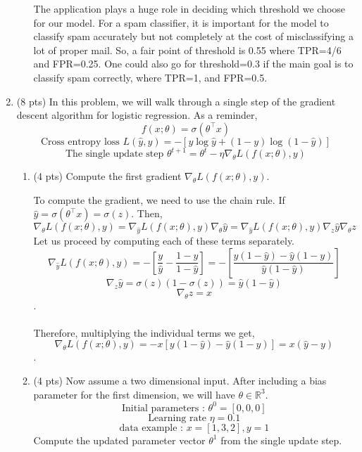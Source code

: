 \documentclass[a4paper]{article}
\theoremstyle{definition}
\newenvironment{soln}{
    \leavevmode\color{blue}\ignorespaces
}{}
\begin{document}
\begin{enumerate}
\begin{enumerate}
	\begin{soln}  The application plays a huge role in deciding which threshold we choose for our model. For a spam classifier, it is important for the model to classify spam accurately but not completely at the cost of misclassifying a lot of proper mail. So, a fair point of threshold is 0.55 where TPR=4/6 and FPR=0.25. One could also go for threshold=0.3 if the main goal is to classify spam correctly, where TPR=1, and FPR=0.5. \end{soln}
\end{enumerate}

\item (8 pts) In this problem, we will walk through a single step of the gradient descent algorithm for logistic regression. As a reminder,
$$f(x;\theta) = \sigma(\theta^\top x)$$
$$\text{Cross entropy loss } L(\hat{y}, y) = -[y \log  \hat{y} + (1-y)\log(1-\hat{y})]$$
$$\text{The single update step } \theta^{t+1} = \theta^{t} - \eta \nabla_{\theta} L(f(x;\theta), y) $$



\begin{enumerate}
	\item (4 pts) Compute the first gradient $\nabla_{\theta} L(f(x;\theta), y)$.
	
	\begin{soln}  To compute the gradient, we need to use the chain rule. If $\hat{y}=\sigma(\theta^\top x)=\sigma(z)$. Then,\\
        $$\nabla_{\theta} L(f(x;\theta), y)=\nabla_{\hat{y}} L(f(x;\theta), y)\nabla_{\theta} \hat{y}=\nabla_{\hat{y}} L(f(x;\theta), y)\nabla_{z} \hat{y}\nabla_{\theta} z$$
        Let us proceed by computing each of these terms separately.
        $$\nabla_{\hat{y}} L(f(x;\theta), y)=-[\frac{y}{\hat{y}}-\frac{1-y}{1-\hat{y}}]=-[\frac{y(1-\hat{y})-\hat{y}(1-y)}{\hat{y}(1-\hat{y})}]$$
        $$\nabla_{z} \hat{y}=\sigma(z)(1-\sigma(z))=\hat{y}(1-\hat{y})$$
        $$\nabla_{\theta} z=x$$.\\ \\

        Therefore, multiplying the individual terms we get, $$\nabla_{\theta} L(f(x;\theta), y)=-x[y(1-\hat{y})-\hat{y}(1-y)]=x(\hat{y}-y)$$.
    \end{soln}
	
	\item (4 pts)
 Now assume a two dimensional input. After including a bias parameter for the first dimension, we will have $\theta\in\mathbb{R}^3$.
$$ \text{Initial parameters : }  \theta^{0}=[0, 0, 0]$$
$$ \text{Learning rate }\eta=0.1$$
$$ \text{data example : } x=[1, 3, 2], y=1$$
Compute the updated parameter vector $\theta^{1}$ from the single update step.
	

\end{enumerate}
\end{enumerate}
\end{document}
